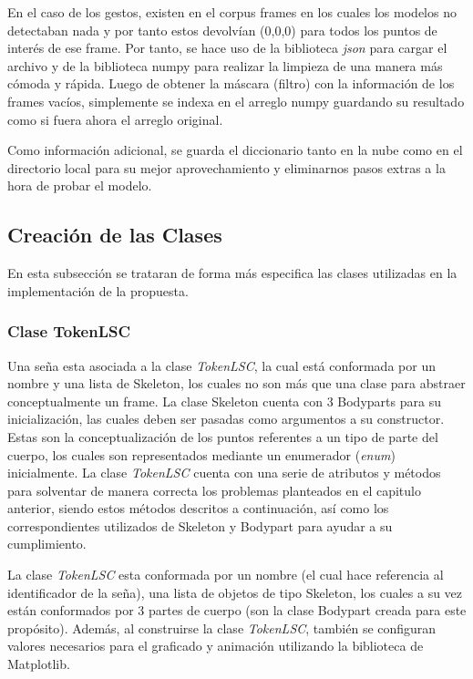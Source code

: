 En el caso de los gestos, existen en el corpus frames en los cuales los modelos no detectaban nada y por tanto estos devolvían (0,0,0) para todos los puntos de interés de ese frame. Por tanto, se hace uso de la biblioteca \textit{json} para cargar el archivo y de la biblioteca numpy para realizar la limpieza de una manera más cómoda y rápida.
Luego de obtener la máscara (filtro) con la información de los frames vacíos, simplemente se indexa en el arreglo numpy guardando su resultado como si fuera ahora el arreglo original.

Como información adicional, se guarda el diccionario tanto en la nube como en el directorio local para su mejor aprovechamiento y eliminarnos pasos extras a la hora de probar el modelo.





%
%


\subsection{Creación de las Clases}
En esta subsección se trataran de forma más especifica las clases utilizadas en la implementación de la propuesta.

\subsubsection{Clase TokenLSC}

Una seña esta asociada a la clase \textit{TokenLSC}, la cual está conformada  por un nombre y una lista de Skeleton, los cuales no son más que una clase para abstraer conceptualmente un frame. La clase Skeleton cuenta con 3 Bodyparts para su inicialización, las cuales deben ser pasadas como argumentos a su constructor. Estas son la conceptualización de los puntos referentes a un tipo de parte del cuerpo, los cuales son representados mediante un enumerador (\textit{enum}) inicialmente.
La clase \textit{TokenLSC} cuenta con una serie de atributos y métodos para solventar de manera correcta los problemas planteados en el capitulo anterior, siendo estos métodos descritos a continuación, así como los correspondientes utilizados de Skeleton y Bodypart para ayudar a su cumplimiento.

La clase \textit{TokenLSC} esta conformada por un nombre (el cual hace referencia al identificador de la seña),  una lista de objetos de tipo Skeleton, los cuales a su vez están conformados  por 3 partes de cuerpo (son la clase Bodypart creada para este propósito). Además, al construirse la clase \textit{TokenLSC}, también se configuran valores necesarios para el graficado y animación utilizando la biblioteca de Matplotlib.

